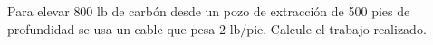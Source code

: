 \item Para elevar $800 \text{ lb}$ de carbón desde un pozo de extracción de 500 pies de profundidad se usa un cable que pesa $2 \text{ lb/pie}$. Calcule el trabajo realizado.
